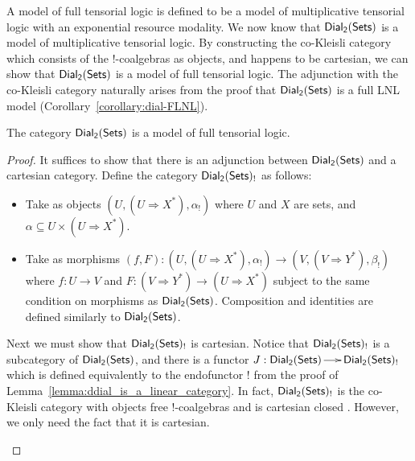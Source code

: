 A model of full tensorial logic is defined to be a model of
multiplicative tensorial logic with an exponential resource
modality. We now know that $\mathsf{Dial_2}(\mathsf{Sets})$ is a model of multiplicative
tensorial logic.  By constructing the co-Kleisli category which
consists of the $!$-coalgebras as objects, and happens to be
cartesian, we can show that $\mathsf{Dial_2}(\mathsf{Sets})$ is a model of full tensorial
logic.  The adjunction with the co-Kleisli category naturally arises
from the proof that $\mathsf{Dial_2}(\mathsf{Sets})$ is a full LNL model
(Corollary~\ref{corollary:dial-FLNL}).
\begin{lemma}
  \label{lemma:full-tensorial-logic}
  The category $\mathsf{Dial_2}(\mathsf{Sets})$ is a model of full tensorial logic.
\end{lemma}
\begin{proof}
    It suffices to show that there is an adjunction between $\mathsf{Dial_2}(\mathsf{Sets})$ and
  a cartesian category.  Define the category $\mathsf{Dial_2}(\mathsf{Sets})_!$ as follows:
  \begin{itemize}
  \item Take as objects $(U , (U \Rightarrow X^*), \alpha_!)$
    where $U$ and $X$ are sets, and $\alpha \subseteq U \times (U \Rightarrow X^*)$.
    
  \item Take as morphisms $(f , F) : (U , (U \Rightarrow X^*),
    \alpha_!) \to (V , (V \Rightarrow Y^*), \beta_!)$ where $f : U \to
    V$ and $F : (V \Rightarrow Y^*) \to (U \Rightarrow X^*)$ subject
    to the same condition on morphisms as $\mathsf{Dial_2}(\mathsf{Sets})$.  Composition and
    identities are defined similarly to $\mathsf{Dial_2}(\mathsf{Sets})$.
  \end{itemize}
  \begin{paper}
    
    Next we must show that $\mathsf{Dial_2}(\mathsf{Sets})_!$ is cartesian.  Notice that
    $\mathsf{Dial_2}(\mathsf{Sets})_!$ is a subcategory of $\mathsf{Dial_2}(\mathsf{Sets})$, and there is a functor $J :
    \mathsf{Dial_2}(\mathsf{Sets}) \to \mathsf{Dial_2}(\mathsf{Sets})_!$ which is defined equivalently to the endofunctor
    $!$ from the proof of Lemma~\ref{lemma:ddial_is_a_linear_category}.
    In fact, $\mathsf{Dial_2}(\mathsf{Sets})_!$ is the co-Kleisli category with objects free
    !-coalgebras and is cartesian closed \cite{dePaiva:1987}.  However,
    we only need the fact that it is cartesian.
    

\end{paper}
\end{proof}
